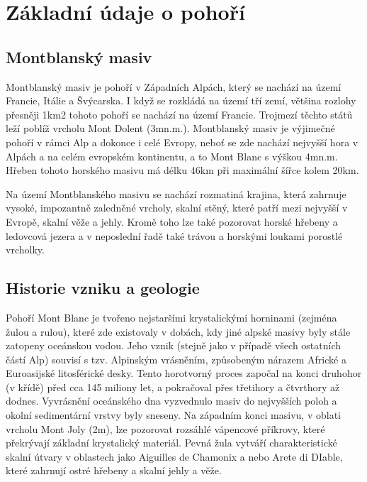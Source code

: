 \chapter{Základní údaje o pohoří}
\label{Pohori}
\def\figurename{Obr.} %
\def\tablename{Tab.} %
\def\figureautorefname{obr.} %
\def\tableautorefname{tab.} %
\def\chapterautorefname{kapitola} %

\section{Montblanský masiv}
Montblanský masiv je pohoří v Západních Alpách, který se nachází na území Francie, Itálie a Švýcarska. I když se rozkládá na území tří zemí, většina rozlohy přesněji 1\:km2 tohoto pohoří se nachází na území Francie. Trojmezí těchto států leží poblíž vrcholu Mont Dolent (3\:m\:n.\:m.). Montblanský masiv je výjimečné pohoří v rámci Alp a dokonce i celé Evropy, neboť se zde nachází nejvyšší hora v Alpách a na celém evropském kontinentu, a to Mont Blanc s výškou 4\:m\:n.\:m. Hřeben tohoto horského masivu má délku 46\:km při maximální šířce kolem 20\:km. 

Na území Montblanského masivu se nachází rozmatiná krajina, která zahrnuje vysoké, impozantně zaledněné vrcholy, skalní stěný, které patří mezi nejvyšší v Evropě, skalní věže a jehly. Kromě toho lze také pozorovat horské hřebeny a ledovcová jezera a v neposlední řadě také trávou a horskými loukami porostlé vrcholky.

\section{Historie vzniku a geologie}
Pohoří Mont Blanc je tvořeno nejstaršími krystalickými horninami (zejména žulou a rulou), které zde existovaly v dobách, kdy jiné alpské masivy byly stále zatopeny oceánskou vodou. Jeho vznik (stejně jako v případě všech ostatních částí Alp) souvisí s tzv. Alpinským vrásněním, způsobeným nárazem Africké a Euroasijské litosférické desky. Tento horotvorný proces započal na konci druhohor (v křídě) před cca 145 miliony let, a pokračoval přes třetihory a čtvrthory až dodnes. Vyvrásnění oceánského dna vyzvednulo masiv do nejvyšších poloh a okolní sedimentární vrstvy byly sneseny. Na západním konci masivu, v oblati vrcholu Mont Joly (2\:m), lze pozorovat rozsáhlé vápencové příkrovy, které překrývají základní krystalický materiál. Pevná žula vytváří charakteristické skalní útvary v oblastech jako Aiguilles de Chamonix a nebo Arete di DIable, které zahrnují ostré hřebeny a skalní jehly a věže.

